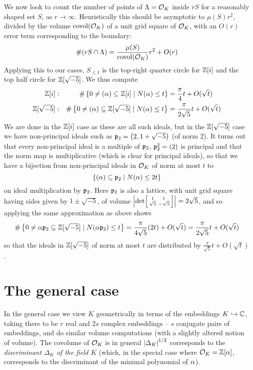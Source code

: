 \documentclass[11pt]{article}
\begin{document}
We now look to count the number of points of $\Lambda = \mathcal{O}_K$ inside $rS$ for a reasonably shaped set $S$, as $r \to \infty$. Heuristically this should be asymptotic to $\mu(S)r^2$, divided by the volume $\operatorname{covol}(\mathcal{O}_K)$ of a unit grid square of $\mathcal{O}_K$, with an $O(r)$ error term corresponding to the boundary:
$$
    \#(rS \cap \Lambda) = \frac{\mu(S)}{\operatorname{covol}(\mathcal{O}_K)}r^2 + O(r)
$$
Applying this to our cases, $S_{\leq 1}$ is the top-right quarter circle for $\mathbb{Z}[i]$ and the top half circle for $\mathbb{Z}[\sqrt{-5}]$. We thus compute
\begin{align*}
    \mathbb{Z}[i]: &&\#\left\{  0 \neq (\alpha) \subseteq \mathbb{Z}[i] \mid N(\alpha) \leq t  \right\} &= \frac{\pi}{4}t + O(\sqrt{t}) \\
    \mathbb{Z}[\sqrt{-5}]: &&\#\left\{  0 \neq (\alpha) \subseteq \mathbb{Z}[\sqrt{-5}] \mid N(\alpha) \leq t  \right\} &= \frac{\pi}{2\sqrt{5}}t + O(\sqrt{t})
\end{align*}
We are done in the $\mathbb{Z}[i]$ case as these are all such ideals, but in the $\mathbb{Z}[\sqrt{-5}]$ case we have non-principal ideals such as $\mathfrak{p}_2 = \left(  2, 1 + \sqrt{-5}  \right)$ (of norm 2). It turns out that every non-principal ideal is a multiple of $\mathfrak{p}_2$, $\mathfrak{p}_2^2 = \left(  2  \right)$ is principal and that the norm map is multiplicative (which is clear for principal ideals), so that we have a bijection from non-principal ideals in $\mathcal{O}_K$ of norm at most $t$ to
$$
    \left\{  (\alpha) \subseteq \mathfrak{p}_2 \mid N(\alpha) \leq 2t  \right\}
$$
on ideal multiplication by $\mathfrak{p}_2$. Here $\mathfrak{p}_2$ is also a lattice, with unit grid square having sides given by $1 \pm \sqrt{-5}$, of volume $\left| \det\begin{bsmallmatrix}
    1 & 1 \\
    \sqrt{5} & -\sqrt{5}
\end{bsmallmatrix} \right| = 2\sqrt{5}$, and so applying the same approximation as above shows
$$
    \#\left\{  0 \neq \alpha \mathfrak{p}_2 \subseteq \mathbb{Z}[\sqrt{-5}] \mid N(\alpha \mathfrak{p}_2) \leq t  \right\} = \frac{\pi}{4\sqrt{5}}(2t) + O(\sqrt{t}) = \frac{\pi}{2\sqrt{5}}t + O(\sqrt{t})
$$
so that the ideals in $\mathbb{Z}[\sqrt{-5}]$ of norm at most $t$ are distributed by $\frac{\pi}{\sqrt{5}}t + O(\sqrt{t})$.
\section{The general case}
In the general case we view $K$ geometrically in terms of the embeddings $K \hookrightarrow \mathbb{C}$, taking there to be $r$ real and $2s$ complex embeddings -- $s$ conjugate pairs of embeddings, and do similar volume computations (with a slightly altered notion of volume). The covolume of $\mathcal{O}_K$ is in general $\left| \Delta_K \right|^{1/2}$ corresponds to the \emph{discriminant $\Delta_K$ of the field $K$} (which, in the special case where $\mathcal{O}_K = \mathbb{Z}[\alpha]$, corresponds to the discriminant of the minimal polynomial of $\alpha$). 
\end{document}
